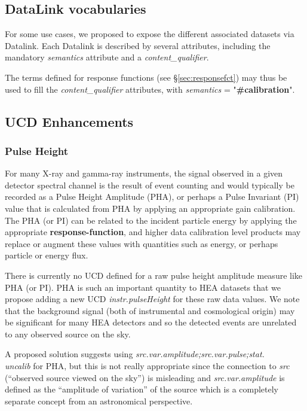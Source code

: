 \documentclass[11pt,a4paper]{ivoa}
\begin{document}
\subsection{DataLink vocabularies}\label{sec:DLs}

For some use cases, we proposed to expose the different associated datasets via Datalink. Each Datalink is described by several attributes, including the mandatory {\em semantics} attribute and a {\em content\_qualifier}.

The terms defined for response functions (see \S\ref{sec:responsefct}) may thus be used to fill the {\em content\_qualifier} attributes, with {\em semantics} = "{\bf \#calibration}".


\subsection{UCD Enhancements}\label{sec:UCDs}

\subsubsection{Pulse Height}

For many X-ray and gamma-ray instruments, the signal observed in a given detector spectral channel is the result of event counting and would typically be recorded as a Pulse Height Amplitude (PHA), or perhaps a Pulse Invariant (PI) value that is calculated from PHA by applying an appropriate gain calibration.  The PHA (or PI) can be related to the incident particle energy by applying the appropriate {\bf response-function}, and higher data calibration level products may replace or augment these values with quantities such as energy, or perhaps particle or energy flux.

There is currently no UCD defined for a raw pulse height amplitude measure like PHA (or PI). PHA is such an important quantity to \gls{HEA} datasets that we propose adding a new UCD {\em instr.pulseHeight\/} for these raw data values.  We note that the background signal (both of instrumental and cosmological origin) may be significant for many \gls{HEA} detectors and so the detected events are unrelated to any observed source on the sky.

A proposed solution suggests using {\em src.var.amplitude;src.var.pulse;stat.\\uncalib\/} for PHA, but this is not really appropriate since the connection to {\em src\/} (``observed source viewed on the sky'') is misleading and {\em src.var.amplitude\/} is defined as the ``amplitude of variation'' of the source which is a completely separate concept from an astronomical perspective.
\end{document}
